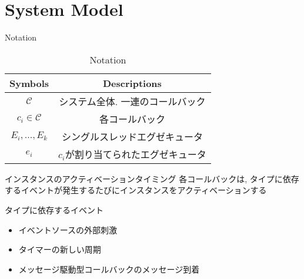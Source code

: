 \section{System Model}
\label{sec: system_model}

\begin{frame}{Notation}
    \begin{table}[h]
        \centering\begin{tabular}{|c|c|}\hline
            \textbf{Symbols}      & \textbf{Descriptions}               \\\hline
            $\mathcal{C}$         & システム全体. 一連のコールバック    \\\hline
            $c_i \in \mathcal{C}$ & 各コールバック                      \\\hline
            $E_i, ..., E_k$       & シングルスレッドエグゼキュータ      \\\hline
            $e_i$                 & $c_i$が割り当てられたエグゼキュータ \\\hline
        \end{tabular}
        \caption{Notation}
        \label{tab: notation}
    \end{table}
\end{frame}

\begin{frame}{インスタンスのアクティベーションタイミング}
    各コールバックは, タイプに依存するイベントが発生するたびにインスタンスをアクティベーションする

    \begin{block}{タイプに依存するイベント}
        \begin{itemize}
            \item イベントソースの外部刺激
            \item タイマーの新しい周期
            \item メッセージ駆動型コールバックのメッセージ到着
        \end{itemize}
    \end{block}
\end{frame}
